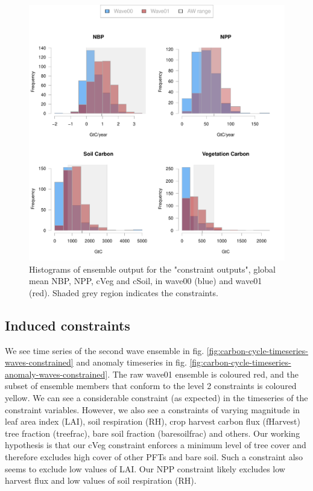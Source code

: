 \documentclass[gmd, manuscript]{copernicus}
\begin{document}
\begin{figure}[t]
\includegraphics[width=12cm]{./figs/fig05.pdf}
\caption{Histograms of ensemble output for the "constraint outputs", global mean NBP, NPP, cVeg and cSoil, in wave00 (blue) and wave01 (red). Shaded grey region indicates the constraints.}
\label{fig:level_2_constraints_hists}
\end{figure}
 
\subsection{Induced constraints}\label{ssec:induced_constraints}

We see time series of the second wave ensemble in fig. \ref{fig:carbon-cycle-timeseries-waves-constrained} and anomaly timeseries in fig. \ref{fig:carbon-cycle-timeseries-anomaly-waves-constrained}. The raw wave01 ensemble is coloured red, and the subset of ensemble members that conform to the level 2 constraints is coloured yellow. We can see a considerable constraint (as expected) in the timeseries of the constraint variables. However, we also see a constraints of varying magnitude in leaf area index (LAI), soil respiration (RH), crop harvest carbon flux (fHarvest) tree fraction (treefrac), bare soil fraction (baresoilfrac) and others. Our working hypothesis is that our cVeg constraint enforces a minimum level of tree cover and therefore excludes high cover of other PFTs and bare soil. Such a constraint also seems to exclude low values of LAI. Our NPP constraint likely excludes low harvest flux and low values of soil respiration (RH).
\end{document}
